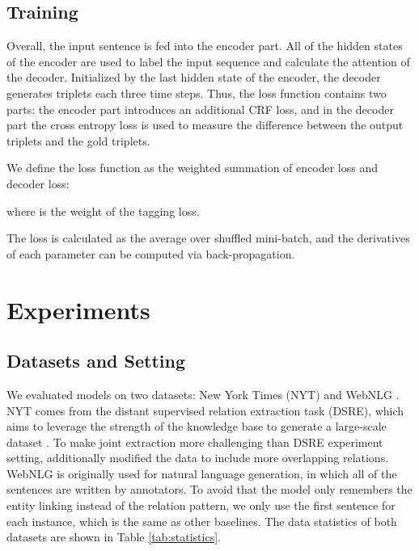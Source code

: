 \documentclass[letterpaper]{article} \usepackage{aaai20}  \usepackage{times}  \usepackage{helvet} \usepackage{courier}  \usepackage[hyphens]{url}  \usepackage{graphicx}
\begin{document}
  \subsection{Training}
  
      Overall, the input sentence is fed into the encoder part. 
      All of the hidden states of the encoder are used to label the input sequence and calculate the attention of the decoder. 
      Initialized by the last hidden state of the encoder, the decoder generates triplets each three time steps. 
      Thus, the loss function contains two parts: the encoder part introduces an additional CRF loss, and in the decoder part the cross entropy loss is used to measure the difference between the output triplets and the gold triplets. 
  
      We define the loss function as the weighted summation of encoder loss and decoder loss:
  
  
  where  is the weight of the tagging loss.
  
  The loss is calculated as the average over shuffled mini-batch, and the derivatives of each parameter can be computed via back-propagation. 



    
  
  \section{Experiments}
  










  \subsection{Datasets and Setting}
  


      We evaluated models on two datasets: New York Times (NYT) \cite{nyt} 
and WebNLG \cite{webnlg}. 
      NYT comes from the distant supervised relation extraction task (DSRE), which aims to leverage the strength of the knowledge base to generate a large-scale dataset \cite{dsre}. To make joint extraction more challenging than DSRE experiment setting, \citeauthor{CopyRE}  additionally modified the data to include more overlapping relations.
WebNLG is originally used for natural language generation, in which all of the sentences are written by annotators. To avoid that the model only remembers the entity linking instead of the relation pattern, we only use the first sentence for each instance, which is the same as other baselines. 
The data statistics of both datasets are shown in Table \ref{tab:statistics}.  
\end{document}
